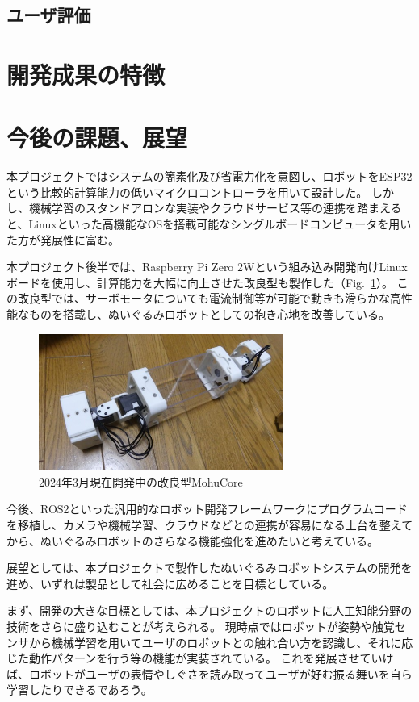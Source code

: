 \documentclass[uplatex,a4paper,12pt]{jsarticle}
\renewcommand{\figurename}{Fig.}
\newcommand{\figref}[1]{\figurename~\ref{#1}}
\begin{document}
\subsection{ユーザ評価}

\section{開発成果の特徴}

\section{今後の課題、展望}
本プロジェクトではシステムの簡素化及び省電力化を意図し、ロボットをESP32という比較的計算能力の低いマイクロコントローラを用いて設計した。
しかし、機械学習のスタンドアロンな実装やクラウドサービス等の連携を踏まえると、Linuxといった高機能なOSを搭載可能なシングルボードコンピュータを用いた方が発展性に富む。

本プロジェクト後半では、Raspberry Pi Zero 2Wという組み込み開発向けLinuxボードを使用し、計算能力を大幅に向上させた改良型も製作した（\figref{fig:prototype_04}）。
この改良型では、サーボモータについても電流制御等が可能で動きも滑らかな高性能なものを搭載し、ぬいぐるみロボットとしての抱き心地を改善している。

\begin{figure}[htbp]
  \centering
  \includegraphics[width=8cm]{images/prototype/prototype_04.jpg}
  \caption{2024年3月現在開発中の改良型MohuCore}
  \label{fig:prototype_04}
\end{figure}

今後、ROS2といった汎用的なロボット開発フレームワークにプログラムコードを移植し、カメラや機械学習、クラウドなどとの連携が容易になる土台を整えてから、ぬいぐるみロボットのさらなる機能強化を進めたいと考えている。

展望としては、本プロジェクトで製作したぬいぐるみロボットシステムの開発を進め、いずれは製品として社会に広めることを目標としている。

まず、開発の大きな目標としては、本プロジェクトのロボットに人工知能分野の技術をさらに盛り込むことが考えられる。
現時点ではロボットが姿勢や触覚センサから機械学習を用いてユーザのロボットとの触れ合い方を認識し、それに応じた動作パターンを行う等の機能が実装されている。
これを発展させていけば、ロボットがユーザの表情やしぐさを読み取ってユーザが好む振る舞いを自ら学習したりできるであろう。
\end{document}
